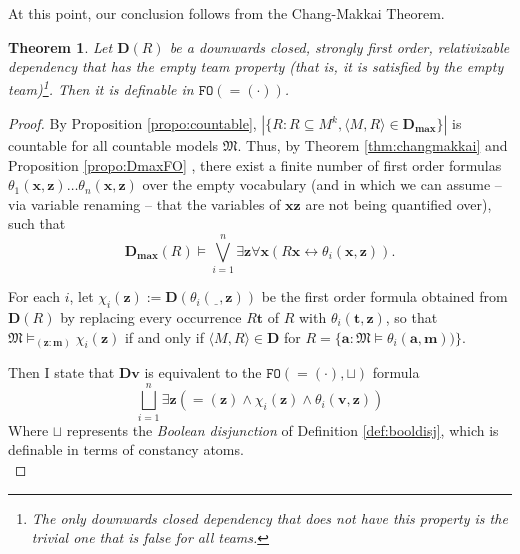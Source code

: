 \documentclass{article}
\newtheorem{Theorem}{Theorem}[section]
\theoremstyle{definition}
\newcommand{\tuple}{\mathbf}
\newcommand{\FO}{\texttt{FO}}
\newcommand{\M}{\mathfrak M}
\newcommand{\D}{\mathbf D}
\newcommand{\Dmax}{\mathbf D_{\textbf{max}}}
\newcommand{\h}{\underline{~~}}
\begin{document}
At this point, our conclusion follows from the Chang-Makkai Theorem. 
\begin{Theorem}
	Let $\D(R)$ be a downwards closed, strongly first order, relativizable dependency that has the empty team property (that is, it is satisfied by the empty team)\footnote{The only downwards closed dependency that does not have this property is the trivial one that is false for all teams.}. Then it is definable in $\FO(=\!\!(\cdot))$. 
\end{Theorem}
\begin{proof}
	By Proposition \ref{propo:countable}, $|\{R : R \subseteq M^k, \langle M, R\rangle  \in \Dmax\}|$ is countable for all countable models $\M$. Thus, by Theorem \ref{thm:changmakkai} and Proposition \ref{propo:DmaxFO} , there exist a finite number of first order formulas $\theta_1(\tuple x, \tuple z) \ldots \theta_n(\tuple x, \tuple z)$ over the empty vocabulary (and in which we can assume -- via variable renaming -- that the variables of $\tuple x \tuple z$ are not being quantified over), such that 
			\[
				\Dmax(R) \models \bigvee_{i=1}^n \exists \tuple z \forall \tuple x (R \tuple x \leftrightarrow \theta_i(\tuple x, \tuple z)).
			\]

			For each $i$, let $\chi_i(\tuple z):=\D(\theta_i(\h,\tuple z))$ be the first order formula obtained from $\D(R)$ by replacing every occurrence $R \tuple t$ of $R$ with $\theta_i(\tuple t, \tuple z)$, so that $\M \models_{(\tuple z:\tuple m)} \chi_i(\tuple z)$ if and only if $\langle M, R\rangle \in \D$ for $R = \{\tuple a : \M \models \theta_i(\tuple a, \tuple m))\}$.

			Then I state that $\D \tuple v$ is equivalent to the $\FO(=\!\!(\cdot), \sqcup)$ formula 
			\begin{equation}
				\bigsqcup_{i=1}^n \exists \tuple z (=\!\!(\tuple z) \wedge \chi_i(\tuple z) \wedge \theta_i(\tuple v, \tuple z))
				\label{eq:tr}
			\end{equation}
			Where $\sqcup$ represents the \emph{Boolean disjunction} of Definition \ref{def:booldisj}, which is definable in terms of constancy atoms.\\%


\end{proof}
\end{document}
